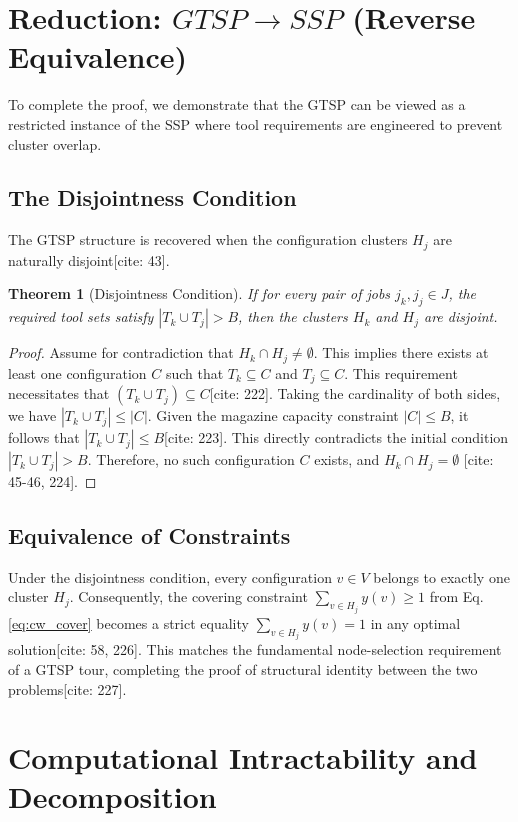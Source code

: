 \documentclass[12pt]{article}
\newtheorem{theorem}{Theorem}[section]
\begin{document}
\section{Reduction: $GTSP \rightarrow SSP$ (Reverse Equivalence)}

To complete the proof, we demonstrate that the GTSP can be viewed as a restricted instance of the SSP where tool requirements are engineered to prevent cluster overlap. 

\subsection{The Disjointness Condition}
The GTSP structure is recovered when the configuration clusters $H_j$ are naturally disjoint[cite: 43]. 

\begin{theorem}[Disjointness Condition]
If for every pair of jobs $j_k, j_j \in J$, the required tool sets satisfy $|T_k \cup T_j| > B$, then the clusters $H_k$ and $H_j$ are disjoint.
\end{theorem}

\begin{proof}
Assume for contradiction that $H_k \cap H_j \neq \emptyset$. This implies there exists at least one configuration $C$ such that $T_k \subseteq C$ and $T_j \subseteq C$. 
This requirement necessitates that $(T_k \cup T_j) \subseteq C$[cite: 222]. 
Taking the cardinality of both sides, we have $|T_k \cup T_j| \le |C|$. 
Given the magazine capacity constraint $|C| \le B$, it follows that $|T_k \cup T_j| \le B$[cite: 223]. 
This directly contradicts the initial condition $|T_k \cup T_j| > B$. 
Therefore, no such configuration $C$ exists, and $H_k \cap H_j = \emptyset$ [cite: 45-46, 224].
\end{proof}

\subsection{Equivalence of Constraints}
Under the disjointness condition, every configuration $v \in V$ belongs to exactly one cluster $H_j$. Consequently, the covering constraint $\sum_{v \in H_j} y(v) \ge 1$ from Eq. \eqref{eq:cw_cover} becomes a strict equality $\sum_{v \in H_j} y(v) = 1$ in any optimal solution[cite: 58, 226]. This matches the fundamental node-selection requirement of a GTSP tour, completing the proof of structural identity between the two problems[cite: 227].

\section{Computational Intractability and Decomposition}
\end{document}
